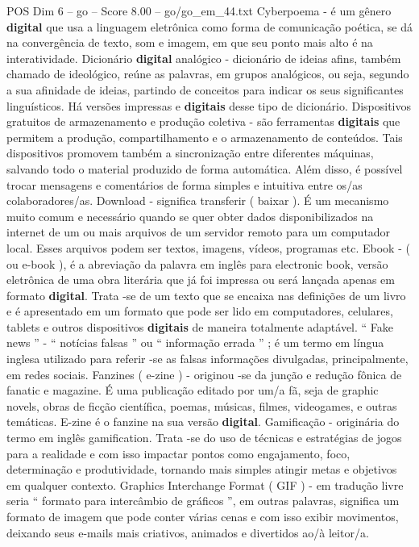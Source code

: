 \begin{textsample}{POS Dim 6 – go – Score 8.00 – go/go\_em\_44.txt}
Cyberpoema - é um gênero \textbf{digital} que usa a linguagem eletrônica como forma de comunicação poética, se dá na convergência de texto, som e imagem, em que seu ponto mais alto é na interatividade.
Dicionário \textbf{digital} analógico - dicionário de ideias afins, também chamado de ideológico, reúne as palavras, em grupos analógicos, ou seja, segundo a sua afinidade de ideias, partindo de conceitos para indicar os seus significantes linguísticos.
Há versões impressas e \textbf{digitais} desse tipo de dicionário.
Dispositivos gratuitos de armazenamento e produção coletiva - são ferramentas \textbf{digitais} que permitem a produção, compartilhamento e o armazenamento de conteúdos.
Tais dispositivos promovem também a sincronização entre diferentes máquinas, salvando todo o material produzido de forma automática.
Além disso, é possível trocar mensagens e comentários de forma simples e intuitiva entre os/as colaboradores/as.
Download - significa transferir ( baixar ).
É um mecanismo muito comum e necessário quando se quer obter dados disponibilizados na internet de um ou mais arquivos de um servidor remoto para um computador local.
Esses arquivos podem ser textos, imagens, vídeos, programas etc.
Ebook - ( ou e-book ), é a abreviação da palavra em inglês para electronic book, versão eletrônica de uma obra literária que já foi impressa ou será lançada apenas em formato \textbf{digital}.
Trata -se de um texto que se encaixa nas definições de um livro e é apresentado em um formato que pode ser lido em computadores, celulares, tablets e outros dispositivos \textbf{digitais} de maneira totalmente adaptável. “ Fake news ” - “ notícias falsas ” ou “ informação errada ” ; é um termo em língua inglesa utilizado para referir -se as falsas informações divulgadas, principalmente, em redes sociais.
Fanzines ( e-zine ) - originou -se da junção e redução fônica de fanatic e magazine.
É uma publicação editado por um/a fã, seja de graphic novels, obras de ficção científica, poemas, músicas, filmes, videogames, e outras temáticas.
E-zine é o fanzine na sua versão \textbf{digital}.
Gamificação - originária do termo em inglês gamification.
Trata -se do uso de técnicas e estratégias de jogos para a realidade e com isso impactar pontos como engajamento, foco, determinação e produtividade, tornando mais simples atingir metas e objetivos em qualquer contexto.
Graphics Interchange Format ( GIF ) - em tradução livre seria “ formato para intercâmbio de gráficos ”, em outras palavras, significa um formato de imagem que pode conter várias cenas e com isso exibir movimentos, deixando seus e-mails mais criativos, animados e divertidos ao/à leitor/a.

\end{textsample}
